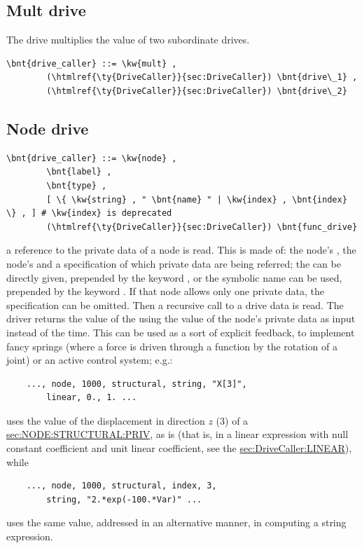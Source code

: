 \subsection{Mult drive}
The  drive multiplies the value of two subordinate drives.
\begin{Verbatim}[commandchars=\\\{\}]
    \bnt{drive_caller} ::= \kw{mult} ,
        (\htmlref{\ty{DriveCaller}}{sec:DriveCaller}) \bnt{drive\_1} ,
        (\htmlref{\ty{DriveCaller}}{sec:DriveCaller}) \bnt{drive\_2}
\end{Verbatim}


\subsection{Node drive}\label{sec:DriveCaller:NODE}
\begin{Verbatim}[commandchars=\\\{\}]
    \bnt{drive_caller} ::= \kw{node} ,
        \bnt{label} ,
        \bnt{type} ,
        [ \{ \kw{string} , " \bnt{name} " | \kw{index} , \bnt{index} \} , ] # \kw{index} is deprecated
        (\htmlref{\ty{DriveCaller}}{sec:DriveCaller}) \bnt{func_drive}
\end{Verbatim}
a reference to the private data of a node is read.
This is made of: the node's , the node's 
and a specification of which private data are being referred;
the  can be directly given, prepended by the keyword
, or the symbolic name  can be used, prepended by 
the keyword .
If that node allows only one private data, the specification 
can be omitted.
Then a recursive call to a drive data is read. 
The driver returns the value of the  
 using the value of the 
node's private data as input instead of the time. 
This can be used as a sort of explicit feedback, to implement fancy
springs (where a force is driven through a function by the rotation
of a joint) or an active control system; e.g.:
\begin{verbatim}
    ..., node, 1000, structural, string, "X[3]",
        linear, 0., 1. ...
\end{verbatim}
uses the value of the displacement in direction $z$ (3) of a
\hyperref{\kw{structural node}}{\kw{structural node}, Section~}{}{sec:NODE:STRUCTURAL:PRIV},
as is (that is, in a linear expression with null constant coefficient 
and unit linear coefficient, see the 
\hyperref{\kw{linear} drive}{\kw{linear} drive, Section~}{}{sec:DriveCaller:LINEAR}),
while
\begin{verbatim}
    ..., node, 1000, structural, index, 3,
        string, "2.*exp(-100.*Var)" ...
\end{verbatim}
uses the same value, addressed in an alternative manner, in computing
a string expression.

